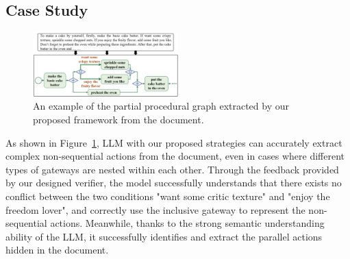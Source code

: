 
\subsection{Case Study}

\begin{figure}[h]
    \centering
    \includegraphics[width=0.5\textwidth]{figures/Case.png}
    \caption{An example of the partial procedural graph extracted by our proposed framework from the document.
    }
    \label{fig:Case}
\end{figure}
As shown in Figure~\ref{fig:Case}, LLM with our proposed strategies can accurately extract complex non-sequential actions from the document, even in cases where different types of gateways are nested within each other. Through the feedback provided by our designed verifier, the model successfully understands that there exists no conflict between the two conditions "want some critic texture" and "enjoy the freedom lover", and correctly use the inclusive gateway to represent the non-sequential actions. 
Meanwhile, thanks to the strong semantic understanding ability of the LLM, it successfully identifies and extract the parallel actions hidden in the document. 

